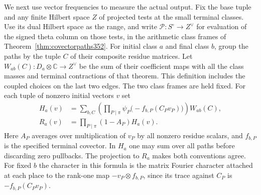 \documentclass[a4paper,11pt]{article}
\theoremstyle{definition}
\theoremstyle{remark}
\numberwithin{equation}{section}
\begin{document}
We next use vector frequencies to measure the actual output.
Fix the base tuple and any finite Hilbert space \(Z\) of
projected tests at the small terminal classes. Use its dual
Hilbert space as the range, and write
\(\mathcal P:S^\circ\to Z^\vee\) for evaluation of the signed
theta column on those tests, in the arithmetic class frames of
Theorem~\ref{thm:covectorpaths352}. For initial class \(a\)
and final class \(b\), group the paths by the tuple \(C\) of
their composite residue matrices. Let
\(W_{ab}(C):D_a\otimes\mathbb C\to Z^\vee\) be the sum of
their coefficient maps with all the class masses and terminal
contractions of that theorem. This definition includes the
coupled choices on the last two edges. The two class frames
are held fixed. For each tuple of nonzero initial vectors
\(v\) set
\[
 \begin{split}
 H_a(v)&=\sum_{b,C}\left(\prod_{P\mid\pi}
        \psi_P\big(-f_{b,P}(C_Pv_P)\big)\right)W_{ab}(C),\\
 R_a(v)&=\prod_{P\mid\pi}(1-A_P)H_a(v).
 \end{split}
\]
Here \(A_P\) averages over multiplication of \(v_P\) by all
nonzero residue scalars, and \(f_{b,P}\) is the specified
terminal covector. In \(H_a\) one may sum over all paths before
discarding zero pullbacks. The projection to \(R_a\) makes
both conventions agree. For fixed \(b\) the character in this
formula is the matrix Fourier character attached at each
place to the rank-one map \(-v_P\otimes f_{b,P}\), since its
trace against \(C_P\) is \(-f_{b,P}(C_Pv_P)\).
\end{document}
